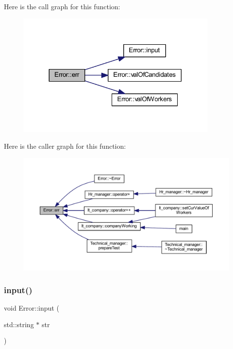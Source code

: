 Here is the call graph for this function\+:
\nopagebreak
\begin{figure}[H]
\begin{center}
\leavevmode
\includegraphics[width=284pt]{class_error_a047207c59d0f2bedd19256e011abb80e_cgraph}
\end{center}
\end{figure}
Here is the caller graph for this function\+:
\nopagebreak
\begin{figure}[H]
\begin{center}
\leavevmode
\includegraphics[width=350pt]{class_error_a047207c59d0f2bedd19256e011abb80e_icgraph}
\end{center}
\end{figure}
\hypertarget{class_error_a9f20c7656a23e4f4cf1fa600ced37421}{}\label{class_error_a9f20c7656a23e4f4cf1fa600ced37421} 
\subsubsection{\texorpdfstring{input()}{input()}}
{\footnotesize\ttfamily void Error\+::input (\begin{DoxyParamCaption}\item[{std\+::string $\ast$}]{str }\end{DoxyParamCaption})}

